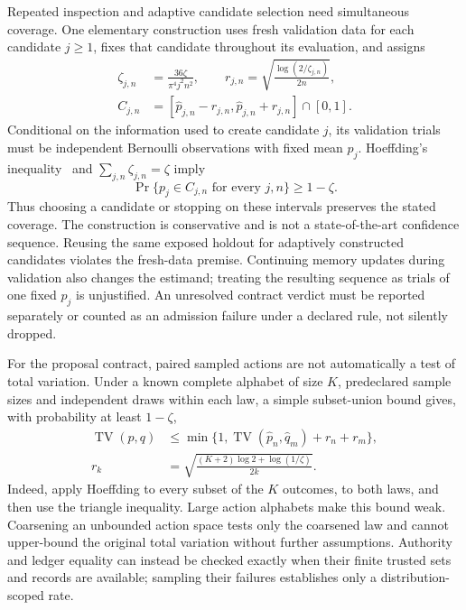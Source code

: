 Repeated inspection and adaptive candidate selection need simultaneous coverage. One elementary construction uses fresh validation data for each candidate $j\geq1$, fixes that candidate throughout its evaluation, and assigns
\begin{equation}
\begin{aligned}
 \zeta_{j,n}&=\frac{36\zeta}{\pi^4j^2n^2},\qquad
 r_{j,n}=\sqrt{\frac{\log(2/\zeta_{j,n})}{2n}},\\
 C_{j,n}&=[\widehat p_{j,n}-r_{j,n},\widehat p_{j,n}+r_{j,n}]\cap[0,1].
\end{aligned}
\end{equation}
Conditional on the information used to create candidate $j$, its validation trials must be independent Bernoulli observations with fixed mean $p_j$. Hoeffding's inequality~\cite{ch02_hoeffding1963} and $\sum_{j,n}\zeta_{j,n}=\zeta$ imply
\begin{equation}
 \Pr\{p_j\in C_{j,n}\text{ for every }j,n\}\geq1-\zeta.
\end{equation}
Thus choosing a candidate or stopping on these intervals preserves the stated coverage. The construction is conservative and is not a state-of-the-art confidence sequence. Reusing the same exposed holdout for adaptively constructed candidates violates the fresh-data premise. Continuing memory updates during validation also changes the estimand; treating the resulting sequence as trials of one fixed $p_j$ is unjustified. An unresolved contract verdict must be reported separately or counted as an admission failure under a declared rule, not silently dropped.

For the proposal contract, paired sampled actions are not automatically a test of total variation. Under a known complete alphabet of size $K$, predeclared sample sizes and independent draws within each law, a simple subset-union bound gives, with probability at least $1-\zeta$,
\begin{equation}
\begin{aligned}
 \operatorname{TV}(p,q)
 &\leq\min\{1,\operatorname{TV}(\widehat p_n,\widehat q_m)+r_n+r_m\},\\
 r_k&=\sqrt{\frac{(K+2)\log2+\log(1/\zeta)}{2k}}.
\end{aligned}
\end{equation}
Indeed, apply Hoeffding to every subset of the $K$ outcomes, to both laws, and then use the triangle inequality. Large action alphabets make this bound weak. Coarsening an unbounded action space tests only the coarsened law and cannot upper-bound the original total variation without further assumptions. Authority and ledger equality can instead be checked exactly when their finite trusted sets and records are available; sampling their failures establishes only a distribution-scoped rate.

